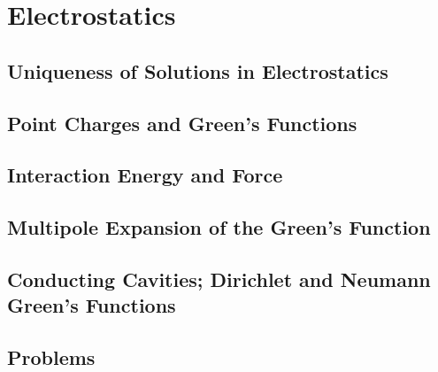 \setcounter{chapter}{0}
\renewcommand{\thechapter}{2}
\chapter{Electrostatics}
\setcounter{equation}{0}	        %

\section{Uniqueness of Solutions in Electrostatics}

\section{Point Charges and Green's Functions}

\section{Interaction Energy and Force}

\section{Multipole Expansion of the Green's Function}

\section{Conducting Cavities; Dirichlet and Neumann Green's Functions} 


\section*{Problems}


